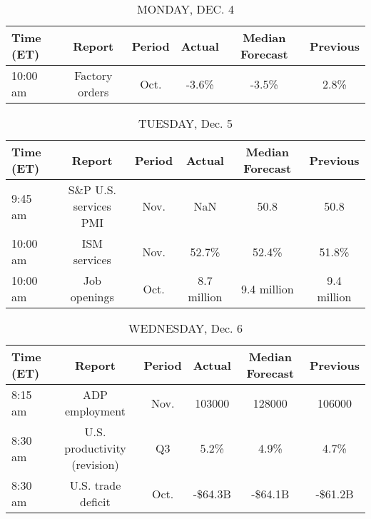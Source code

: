 \documentclass{article}%
\begin{document}
%
\normalsize%


\begin{table}[htbp]%
\caption{MONDAY, DEC. 4}%
\centering%
\begin{adjustbox}{width=1\textwidth}%
\begin{tabular}{lccccc}
\toprule
Time (ET) &         Report & Period & Actual & Median Forecast & Previous \\
\midrule
 10:00 am & Factory orders &   Oct. &  -3.6\% &           -3.5\% &     2.8\% \\
\bottomrule
\end{tabular}
%
\end{adjustbox}%
\end{table}

%


\begin{table}[htbp]%
\caption{TUESDAY, Dec. 5}%
\centering%
\begin{adjustbox}{width=1\textwidth}%
\begin{tabular}{lccccc}
\toprule
Time (ET) &                Report & Period &      Actual & Median Forecast &    Previous \\
\midrule
  9:45 am & S\&P U.S. services PMI &   Nov. &         NaN &            50.8 &        50.8 \\
 10:00 am &          ISM services &   Nov. &       52.7\% &           52.4\% &       51.8\% \\
 10:00 am &          Job openings &   Oct. & 8.7 million &     9.4 million & 9.4 million \\
\bottomrule
\end{tabular}
%
\end{adjustbox}%
\end{table}

%


\begin{table}[htbp]%
\caption{WEDNESDAY, Dec. 6}%
\centering%
\begin{adjustbox}{width=1\textwidth}%
\begin{tabular}{lccccc}
\toprule
Time (ET) &                       Report & Period &  Actual & Median Forecast & Previous \\
\midrule
  8:15 am &               ADP employment &   Nov. &  103000 &          128000 &   106000 \\
  8:30 am & U.S. productivity (revision) &     Q3 &    5.2\% &            4.9\% &     4.7\% \\
  8:30 am &           U.S. trade deficit &   Oct. & -\$64.3B &         -\$64.1B &  -\$61.2B \\
\bottomrule
\end{tabular}
%
\end{adjustbox}%
\end{table}
\end{document}
